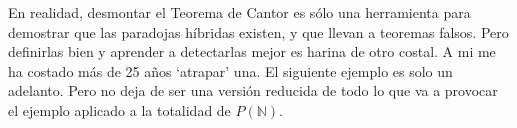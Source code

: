 	\noindent
	En realidad, desmontar el Teorema de Cantor es sólo una herramienta para demostrar que las paradojas híbridas existen, y que llevan a teoremas falsos. Pero definirlas bien y aprender a detectarlas mejor es harina de otro costal. A mi me ha costado más de 25 años `atrapar' una. El siguiente ejemplo es solo un adelanto. Pero no deja de ser una versión reducida de todo lo que va a provocar el ejemplo aplicado a la totalidad de $P(\mathbb{N})$.\\\\ 


